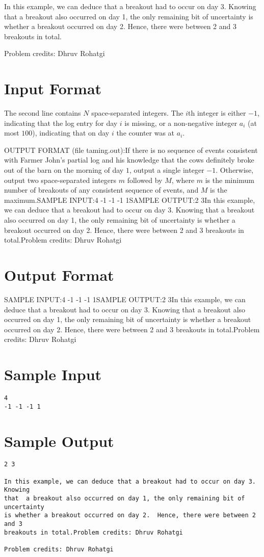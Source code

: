 \documentclass[12pt]{article}
\begin{document}
In this example, we can deduce that a breakout had to occur on day 3.  Knowing
that  a breakout also occurred on day 1, the only remaining bit of uncertainty
is whether a breakout occurred on day 2.  Hence, there were between 2 and 3
breakouts in total.

Problem credits: Dhruv Rohatgi



\section*{Input Format}
The second line contains $N$ space-separated integers. The $i$th integer is
either $-1$, indicating that the log entry for day $i$ is missing, or a
non-negative integer $a_i$ (at most $100$), indicating that on day $i$ the counter
was at
$a_i$.

OUTPUT FORMAT (file taming.out):If there is no sequence of events consistent with Farmer John's partial log and
his knowledge that the cows definitely broke out of the barn on the morning of
day $1$, output a single integer $-1$.  Otherwise, output two space-separated
integers $m$ followed by $M$, where $m$ is the minimum number of breakouts of
any consistent sequence of events, and $M$ is the maximum.SAMPLE INPUT:4
-1 -1 -1 1SAMPLE OUTPUT:2 3In this example, we can deduce that a breakout had to occur on day 3.  Knowing
that  a breakout also occurred on day 1, the only remaining bit of uncertainty
is whether a breakout occurred on day 2.  Hence, there were between 2 and 3
breakouts in total.Problem credits: Dhruv Rohatgi

\section*{Output Format}
SAMPLE INPUT:4
-1 -1 -1 1SAMPLE OUTPUT:2 3In this example, we can deduce that a breakout had to occur on day 3.  Knowing
that  a breakout also occurred on day 1, the only remaining bit of uncertainty
is whether a breakout occurred on day 2.  Hence, there were between 2 and 3
breakouts in total.Problem credits: Dhruv Rohatgi

\section*{Sample Input}
\begin{verbatim}
4
-1 -1 -1 1
\end{verbatim}

\section*{Sample Output}
\begin{verbatim}
2 3

In this example, we can deduce that a breakout had to occur on day 3.  Knowing
that  a breakout also occurred on day 1, the only remaining bit of uncertainty
is whether a breakout occurred on day 2.  Hence, there were between 2 and 3
breakouts in total.Problem credits: Dhruv Rohatgi

Problem credits: Dhruv Rohatgi
\end{verbatim}
\end{document}
